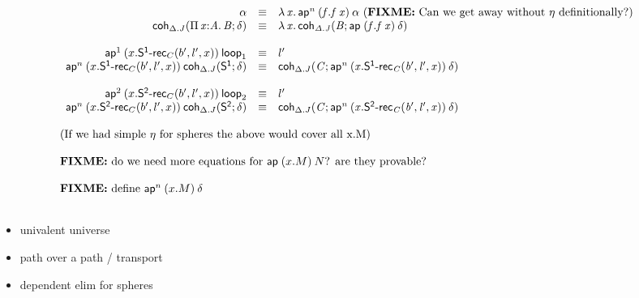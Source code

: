 \begin{small}
\[\begin{array}{l}
\begin{array}{rcl}
\alpha & \equiv & \mathit{\lambda\,x.\,\mathsf{ap}^{n} \: {(f.\mathit{f \: x})} \: {\alpha}} \text{ (\textbf{FIXME:} Can we get away without $\eta$ definitionally?)} \\

\mathsf{coh}_{\Delta.J} \mathit{(\textnormal{$\Pi$}\,\mathit{x} \mathit{:} \mathit{A}.\,\mathit{B};\delta)} & \equiv & \mathit{\lambda\,x.\,\mathsf{coh}_{\Delta.J} \mathit{(B;\mathsf{ap}^{} \: {(f.\mathit{f \: x})} \: {\delta})}} \\
\\ 

\mathsf{ap}^{1} \: {(x.\mathsf{S^{1}\text{-}rec}_{C}(b',l',x))} \: {\mathsf{loop}_{1}} & \equiv & l' \\

\mathsf{ap}^{n} \: {(x.\mathsf{S^{1}\text{-}rec}_{C}(b',l',x))} \: {\mathsf{coh}_{\text{\ensuremath{\Delta}}.J} \mathit{(\mathsf{S^1};\delta)}} & \equiv & 
\mathsf{coh}_{\Delta.J} \mathit{(C;\mathsf{ap}^{n} \: {(x.\mathsf{S^{1}\text{-}rec}_{C}(b',l',x))} \: {\delta})} \\

\\ 

\mathsf{ap}^{2} \: {(x.\mathsf{S^{2}\text{-}rec}_{C}(b',l',x))} \: {\mathsf{loop}_{2}} & \equiv & l' \\

\mathsf{ap}^{n} \: {(x.\mathsf{S^{2}\text{-}rec}_{C}(b',l',x))} \: {\mathsf{coh}_{\text{\ensuremath{\Delta}}.J} \mathit{(\mathsf{S^2};\delta)}} & \equiv & 
\mathsf{coh}_{\Delta.J} \mathit{(C;\mathsf{ap}^{n} \: {(x.\mathsf{S^{2}\text{-}rec}_{C}(b',l',x))} \: {\delta})} \\
\end{array}
\\ \\
\text{(If we had simple $\eta$ for spheres the above would cover all x.M)}
\\ \\
\text{\textbf{FIXME:} do we need more equations for \ensuremath{\mathsf{ap}^{} \: {(x.M)} \: {N}}? are
    they provable?}
\\ \\
\text{\textbf{FIXME:} define \ensuremath{\mathsf{ap}^{n} \: {(x.M)} \: {\delta}}}

\\ \\
\end{array}
\]
\end{small}

\noindent
{}
\begin{small}
\begin{itemize}
\item univalent universe
\item path over a path / transport
\item dependent elim for spheres
\end{itemize}
\end{small}



\qquad
\\ \\


